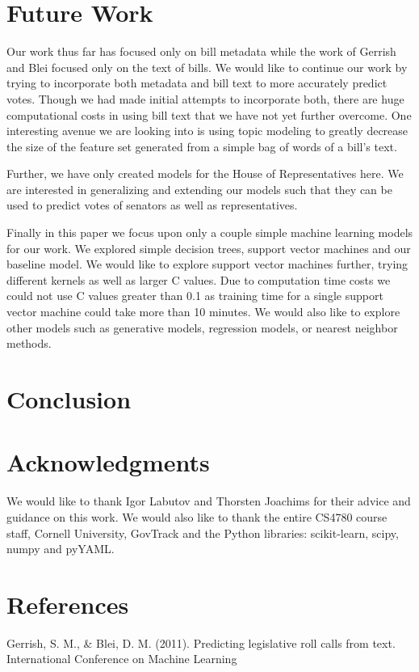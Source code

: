 \documentclass[11pt,letterpaper,twocolumn]{article}
\begin{document}
\section{Future Work}

Our work thus far has focused only on bill metadata while the work of Gerrish and Blei focused only on the text of bills. We would like to continue our work by trying to incorporate both metadata and bill text to more accurately predict votes. Though we had made initial attempts to incorporate both, there are huge computational costs in using bill text that we have not yet further overcome. One interesting avenue we are looking into is using topic modeling to greatly decrease the size of the feature set generated from a simple bag of words of a bill's text.

Further, we have only created models for the House of Representatives here. We are interested in generalizing and extending our models such that they can be used to predict votes of senators as well as representatives. 

Finally in this paper we focus upon only a couple simple machine learning models for our work. We explored simple decision trees, support vector machines and our baseline model. We would like to explore support vector machines further, trying different kernels as well as larger C values. Due to computation time costs we could not use C values greater than 0.1 as training time for a single support vector machine could take more than 10 minutes. We would also like to explore other models such as generative models, regression models, or nearest neighbor methods.

\section{Conclusion}

\section*{Acknowledgments}

We would like to thank Igor Labutov and Thorsten Joachims for their advice and guidance on this work. We would also like to thank the entire CS4780 course staff, Cornell University, GovTrack and the Python libraries: scikit-learn, scipy, numpy and pyYAML.

\pagebreak

\section*{References}

Gerrish, S. M., \& Blei, D. M. (2011). Predicting legislative roll calls from text. International Conference on Machine Learning
\end{document}
